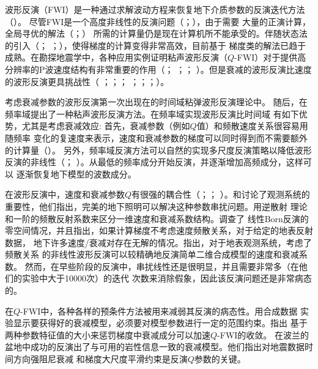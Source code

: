 波形反演（FWI）是一种通过求解波动方程来恢复地下介质参数的反演迭代方法（）。
尽管FWI是一个高度非线性的反演问题（；），由于需要
大量的正演计算，全局寻优的解法（；）
所需的计算量仍是现在计算机所不能承受的。伴随状态法的引入（；
；），使得梯度的计算变得非常高效，目前基于
梯度类的解法已趋于成熟。在勘探地震学中，各种应用实例证明粘声波形反演（$Q$-FWI）对于提供高
分辨率的P波速度结构有非常重要的作用（； 
；； ）。但是衰减的波形反演比速度的波形反演更具挑战性（
；；； 
；；；）。

考虑衰减参数的波形反演第一次出现在的时间域粘弹波形反演理论中。
随后，在频率域提出了一种粘声波形反演方法。在频率域实现波形反演比时间域
有如下优势，尤其是考虑衰减效应: 首先，衰减参数（例如$Q$值）和频散速度关系很容易用随频率
变化的复速度来表示，速度和衰减参数的梯度可以同时得到而不需要额外的计算量（）。
另外，频率域反演方法可以自然的实现多尺度反演策略以降低波形反演的非线性（；
）。从最低的频率成分开始反演，并逐渐增加高频成分，这样可以
逐渐恢复地下模型的波数成分。

在波形反演中，速度和衰减参数$Q$有很强的耦合性（；；
）。和讨论了观测系统的
重要性，他们指出，完美的地下照明可以解决这种参数串扰问题。用逆散射
理论和一阶的频散反射系数来区分一维速度和衰减系数结构。调查了
线性Born反演的零空间情况，并且指出，如果计算梯度不考虑速度频散关系，对于给定的地表反射数据，
地下许多速度/衰减对存在无解的情况。指出，对于地表观测系统，考虑了频散关系
的非线性波形反演可以较精确地反演简单二维合成模型的速度和衰减系数。
然而，在早些阶段的反演中，串扰线性还是很明显，并且需要非常多（在他们的实验中大于10000次）的迭代
次数来消除假象，因此该反演问题还是非常病态的。

在$Q$-FWI中，各种各样的预条件方法被用来减弱其反演的病态性。用合成数据
实验显示要获得好的衰减模型，必须要对模型参数进行一定的范围约束。指出
基于两种参数特征值的大小来惩罚梯度中衰减成分可以加速$Q$-FWI的收敛。
在波兰的盆地中成功的反演出了与可用的岩性信息一致的衰减模型。他们指出对地震数据时间方向强阻尼衰减
和梯度大尺度平滑约束是反演$Q$参数的关键。

